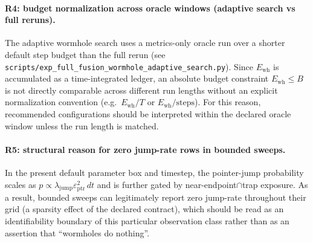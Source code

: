 \paragraph{R4: budget normalization across oracle windows (adaptive search vs full reruns).}
\AuditTag The adaptive wormhole search uses a metrics-only oracle run over a shorter default step budget than the full rerun (see \texttt{scripts/exp\_full\_fusion\_wormhole\_adaptive\_search.py}).
Since $E_{\mathrm{wh}}$ is accumulated as a time-integrated ledger, an absolute budget constraint $E_{\mathrm{wh}}\le B$ is not directly comparable across different run lengths without an explicit normalization convention (e.g.\ $E_{\mathrm{wh}}/T$ or $E_{\mathrm{wh}}/\text{steps}$).
For this reason, recommended configurations should be interpreted within the declared oracle window unless the run length is matched.

\paragraph{R5: structural reason for zero jump-rate rows in bounded sweeps.}
\AuditTag In the present default parameter box and timestep, the pointer-jump probability scales as $p\propto \lambda_{\mathrm{jump}}\varepsilon_{\mathrm{ptr}}^2\,dt$ and is further gated by near-endpoint$\cap$trap exposure.
As a result, bounded sweeps can legitimately report zero jump-rate throughout their grid (a sparsity effect of the declared contract), which should be read as an identifiability boundary of this particular observation class rather than as an assertion that ``wormholes do nothing''.
